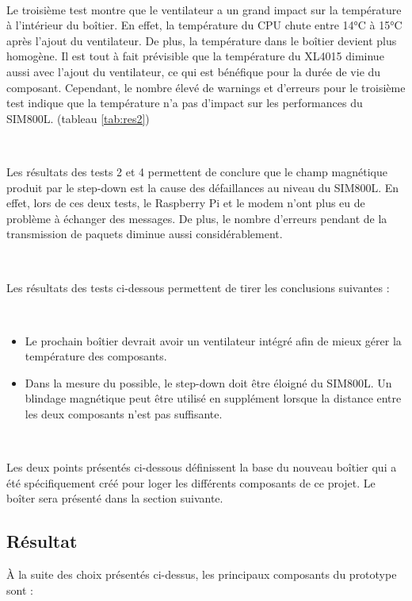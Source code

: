 ~

\noindent
Le troisième test montre que le ventilateur a un grand impact sur la température à l'intérieur du boîtier. En effet, la température du CPU chute entre 14°C à 15°C après l'ajout du ventilateur. De plus, la température dans le boîtier devient plus homogène. Il est tout à fait prévisible que la température du XL4015 diminue aussi avec l'ajout du ventilateur, ce qui est bénéfique pour la durée de vie du composant. Cependant, le nombre élevé de warnings et d'erreurs pour le troisième test indique que la température n'a pas d'impact sur les performances du SIM800L. (tableau \ref{tab:res2})

~

\noindent
Les résultats des tests 2 et 4 permettent de conclure que le champ magnétique produit par le step-down est la cause des défaillances au niveau du SIM800L. En effet, lors de ces deux tests, le Raspberry Pi et le modem n'ont plus eu de problème à échanger des messages. De plus, le nombre d'erreurs pendant de la transmission de paquets diminue aussi considérablement.

~

\noindent
Les résultats des tests ci-dessous permettent de tirer les conclusions suivantes :

~

\begin{itemize}
  \item Le prochain boîtier devrait avoir un ventilateur intégré afin de mieux gérer la température des composants.
  \item Dans la mesure du possible, le step-down doit être éloigné du SIM800L. Un blindage magnétique peut être utilisé en supplément lorsque la distance entre les deux composants n'est pas suffisante.
\end{itemize}

~

\noindent
Les deux points présentés ci-dessous définissent la base du nouveau boîtier qui a été spécifiquement créé pour loger les différents composants de ce projet. Le boîter sera présenté dans la section suivante.


\subsection{Résultat}
\label{sec:protores}

\noindent
À la suite des choix présentés ci-dessus, les principaux composants du prototype sont :

